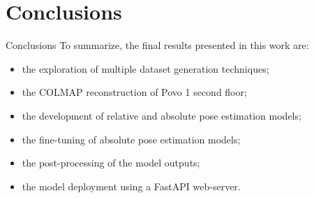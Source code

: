 \documentclass[
    center,
]{beamer}
\begin{document}
\section{Conclusions}
\begin{frame}{Conclusions}
    To summarize, the final results presented in this work are:
    \begin{itemize}
        \item the exploration of multiple dataset generation techniques;
        \item the COLMAP reconstruction of Povo 1 second floor;
        \item the development of relative and absolute pose estimation models;
        \item the fine-tuning of absolute pose estimation models;
        \item the post-processing of the model outputs;
        \item the model deployment using a FastAPI web-server. 
    \end{itemize}
\end{frame}

\end{document}
